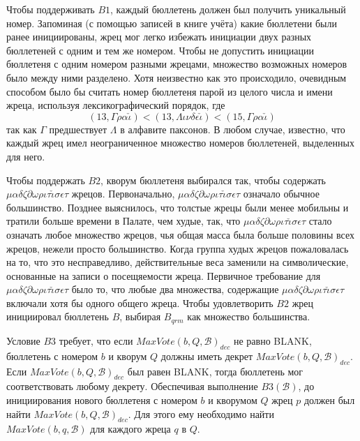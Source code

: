 \documentclass[12pt, a4paper]{article} %
\begin{document}
Чтобы поддерживать $B1$, каждый бюллетень должен был получить уникальный номер. Запоминая (с помощью записей в книге учёта) какие бюллетени были ранее инициированы, жрец мог легко избежать инициации двух разных бюллетеней с одним и тем же номером. Чтобы не допустить инициации бюллетеня с одним номером разными жрецами, множество возможных номеров было между ними разделено. Хотя неизвестно как это происходило, очевидным способом было бы считать номер бюллетеня парой из целого числа и имени жреца, используя лексикографический порядок, где
\[
    (13, \Gamma\rho\alpha\check{\iota}) < (13, \Lambda\iota\nu\delta\epsilon\check{\iota}) < (15, \Gamma\rho\alpha\check{\iota})
\]
так как $\Gamma$ предшествует $\Lambda$ в алфавите паксонов. В любом случае, известно, что каждый жрец имел неограниченное множество номеров бюллетеней, выделенных для него.

Чтобы поддержать $B2$, кворум бюллетеня выбирался так, чтобы содержать $\mu\alpha\delta\zeta\partial\omega\rho\iota\tau\check{\iota}\sigma\epsilon\tau$ жрецов. Первоначально, $\mu\alpha\delta\zeta\partial\omega\rho\iota\tau\check{\iota}\sigma\epsilon\tau$ означало обычное большинство. Позднее выяснилось, что толстые жрецы были менее мобильны и тратили больше времени в Палате, чем худые, так, что $\mu\alpha\delta\zeta\partial\omega\rho\iota\tau\check{\iota}\sigma\epsilon\tau$ стало означать любое множество жрецов, чья общая масса была больше половины всех жрецов, нежели просто большинство. Когда группа худых жрецов пожаловалась на то, что это несправедливо, действительные веса заменили на символические, основанные на записи о посещяемости жреца. Первичное требование для $\mu\alpha\delta\zeta\partial\omega\rho\iota\tau\check{\iota}\sigma\epsilon\tau$ было то, что любые два множества, содержащие $\mu\alpha\delta\zeta\partial\omega\rho\iota\tau\check{\iota}\sigma\epsilon\tau$ включали хотя бы одного общего жреца. Чтобы удовлетворить $B2$ жрец инициировал бюллетень $B$, выбирая $B_{qrm}$ как множество большинства.

Условие $B3$ требует, что если $MaxVote(b, Q, \mathcal{B})_{dec}$ не равно \textsc{BLANK}, бюллетень с номером $b$ и кворум $Q$ должны иметь декрет $MaxVote(b, Q, \mathcal{B})_{dec}$. Если $MaxVote(b, Q, \mathcal{B})_{dec}$ был равен \textsc{BLANK}, тогда бюллетень мог соответствовать любому декрету. Обеспечивая выполнение $B3(\mathcal{B})$, до инициирования нового бюллетеня с номером $b$ и кворумом $Q$ жрец $p$ должен был найти $MaxVote(b, Q, \mathcal{B})_{dec}$. Для этого ему необходимо найти $MaxVote(b, q, \mathcal{B})$ для каждого жреца $q$ в $Q$.
\end{document}
